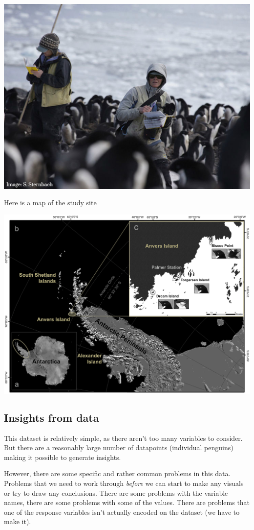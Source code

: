 \documentclass[
]{book}
\begin{document}
\includegraphics[width=0.8\linewidth]{images/penguin-expedition}

Here is a map of the study site

\includegraphics[width=0.8\linewidth]{images/antarctica-map}

\hypertarget{insights-from-data}{%
\subsection{Insights from data}\label{insights-from-data}}

This dataset is relatively simple, as there aren't too many variables to consider. But there are a reasonably large number of datapoints (individual penguins) making it possible to generate insights.

However, there are some specific and rather common problems in this data. Problems that we need to work through \emph{before} we can start to make any visuals or try to draw any conclusions. There are some problems with the variable names, there are some problems with some of the values. There are problems that one of the response variables isn't actually encoded on the dataset (we have to make it).
\end{document}
